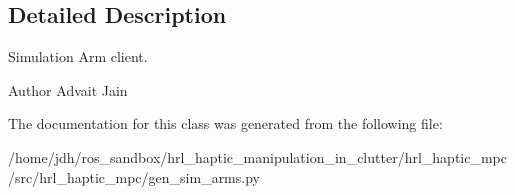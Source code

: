 \subsection{\-Detailed \-Description}
\-Simulation \-Arm client. 

\begin{DoxyAuthor}{\-Author}
\-Advait \-Jain 
\end{DoxyAuthor}


\-The documentation for this class was generated from the following file\-:\begin{DoxyCompactItemize}
\item 
/home/jdh/ros\-\_\-sandbox/hrl\-\_\-haptic\-\_\-manipulation\-\_\-in\-\_\-clutter/hrl\-\_\-haptic\-\_\-mpc/src/hrl\-\_\-haptic\-\_\-mpc/gen\-\_\-sim\-\_\-arms.\-py\end{DoxyCompactItemize}
